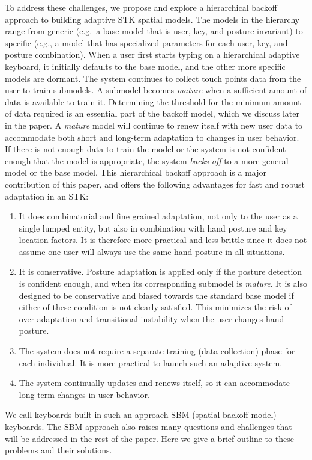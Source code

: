 \documentclass{sigchi}
\begin{document}
To address these challenges, we propose and explore a hierarchical backoff approach to building adaptive STK spatial models. The models in the hierarchy range from generic (e.g.\ a base model that is user, key, and posture invariant) to specific (e.g., a model that has specialized parameters for each user, key, and posture combination). When a user first starts typing on a hierarchical adaptive keyboard, it initially defaults to the base model, and the other more specific models are dormant. The system continues to collect touch points data from the user to train submodels. A submodel becomes \textit{mature} when a sufficient amount of data is available to train it. Determining the threshold for the minimum amount of data required is an essential part of the backoff model, which we discuss later in the paper.
A \textit{mature} model will continue to renew itself with new user data to accommodate  both short and long-term adaptation to changes in user behavior. If there is not enough data to train the model or the system is not confident enough that the model is appropriate, the system \textit{backs-off} to a more general model or the base model. This hierarchical backoff approach is a major contribution of this paper, and offers the following advantages for fast and robust adaptation in an STK:
\begin{enumerate}
\item It does combinatorial and fine grained adaptation, not only to the user as a single lumped entity, but also in combination with hand posture and key location factors. It is therefore more practical and less brittle since it does not assume one user will always use the same hand posture in all situations.

\item It is conservative. Posture adaptation is applied only if the posture detection is confident enough, and when its corresponding submodel is \textit{mature}. It is also designed to be conservative and biased towards the standard base model if either of these condition is not clearly satisfied. This minimizes the risk of over-adaptation and transitional instability when the user changes hand posture.

\item The system does not require a separate training (data collection) phase for each individual. It is more practical to launch such an adaptive system.

\item The system continually updates and renews itself, so it can accommodate
long-term changes in user behavior.
\end{enumerate}
We call keyboards built in such an approach SBM (spatial backoff model) keyboards. The SBM approach also raises many questions and challenges that will be addressed in the rest of the paper. Here we give a brief outline to these problems and their solutions.
\end{document}
